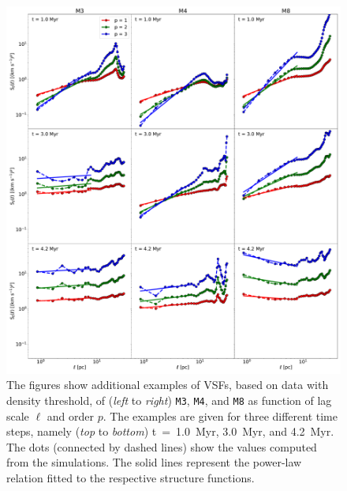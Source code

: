 \begin{figure}
    \centering
    \includegraphics[width=\textwidth]{app_examples_wthres_s_l.pdf}
    \caption{
        The figures show additional examples of VSFs, based on data with density threshold, of (\textit{left} to \textit{right}) \texttt{M3}, \texttt{M4}, and \texttt{M8} as function of lag scale $\ell$ and order $p$. 
        The examples are given for three different time steps, namely (\textit{top} to \textit{bottom}) t~=~1.0~Myr, 3.0~Myr, and 4.2~Myr.
        The dots (connected by dashed lines) show the values computed from the simulations. 
        The solid lines represent the power-law relation fitted to the respective structure functions.
    }
    \label{pic:appInertial:examples_with_threshold_s_vs_l}
\end{figure}
 	
